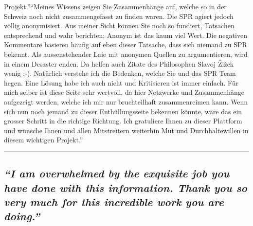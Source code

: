 {{{{Projekt.''}}{``Meines Wissens zeigen Sie Zusammenhänge auf, welche so in der Schweiz noch nicht zusammengefasst zu finden waren. Die SPR agiert jedoch völlig anonymisiert. Aus meiner Sicht können Sie noch so fundiert, Tatsachen entsprechend und wahr berichten; Anonym ist das kaum viel Wert. Die negativen Kommentare basieren häufig auf eben dieser Tatsache, dass sich niemand zu SPR bekennt. Als aussenstehender Laie mit anonymen Quellen zu argumentieren, wird in einem Desaster enden. Da helfen auch Zitate des Philosophen Slavoj Žižek wenig :-). Natürlich verstehe ich die Bedenken, welche Sie und das SPR Team hegen. Eine Lösung habe ich auch nicht und Kritisieren ist immer einfach. Für mich selber ist diese Seite sehr wertvoll, da hier Netzwerke und Zusammenhänge aufgezeigt werden, welche ich mir nur bruchteilhaft zusammenreimen kann. Wenn sich nun noch jemand zu dieser Enthüllungsseite bekennen könnte, wäre das ein grosser Schritt in die richtige Richtung. Ich gratuliere Ihnen zu dieser Plattform und wünsche Ihnen und allen Mitstreitern weiterhin Mut und Durchhaltewillen in diesem wichtigen Projekt.''}}\label{meines-wissens-zeigen-sie-zusammenhuxe4nge-auf-welche-so-in-der-schweiz-noch-nicht-zusammengefasst-zu-finden-waren-die-spr-agiert-jedoch-vuxf6llig-anonymisiert-aus-meiner-sicht-kuxf6nnen-sie-noch-so-fundiert-tatsachen-entsprechend-und-wahr-berichten-anonym-ist-das-kaum-viel-wert-die-negativen-kommentare-basieren-huxe4ufig-auf-eben-dieser-tatsache-dass-sich-niemand-zu-spr-bekennt-als-aussenstehender-laie-mit-anonymen-quellen-zu-argumentieren-wird-in-einem-desaster-enden-da-helfen-auch-zitate-des-philosophen-slavoj-ux17eiux17eek-wenig---natuxfcrlich-verstehe-ich-die-bedenken-welche-sie-und-das-spr-team-hegen-eine-luxf6sung-habe-ich-auch-nicht-und-kritisieren-ist-immer-einfach-fuxfcr-mich-selber-ist-diese-seite-sehr-wertvoll-da-hier-netzwerke-und-zusammenhuxe4nge-aufgezeigt-werden-welche-ich-mir-nur-bruchteilhaft-zusammenreimen-kann-wenn-sich-nun-noch-jemand-zu-dieser-enthuxfcllungsseite-bekennen-kuxf6nnte-wuxe4re-das-ein-grosser-schritt-in-die-richtige-richtung-ich-gratuliere-ihnen-zu-dieser-plattform-und-wuxfcnsche-ihnen-und-allen-mitstreitern-weiterhin-mut-und-durchhaltewillen-in-diesem-wichtigen-projekt}}

\begin{center}\rule{0.5\linewidth}{\linethickness}\end{center}

\hypertarget{i-am-overwhelmed-by-the-exquisite-job-you-have-done-with-this-information-thank-you-so-very-much-for-this-incredible-work-you-are-doing}{%
\subsection{\texorpdfstring{\emph{``I am overwhelmed by the exquisite
job you have done with this information. Thank you so very much for this
incredible work you are
doing.''}}{``I am overwhelmed by the exquisite job you have done with this information. Thank you so very much for this incredible work you are doing.''}}\label{i-am-overwhelmed-by-the-exquisite-job-you-have-done-with-this-information-thank-you-so-very-much-for-this-incredible-work-you-are-doing}}

